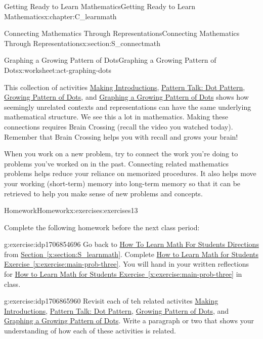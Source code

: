\documentclass[oneside,10pt,]{book}
\newcommand{\xreffont}{\relax}
\numberwithin{equation}{chapter}
\begin{document}
\begin{chapterptx}{Getting Ready to Learn Mathematics}{}{Getting Ready to Learn Mathematics}{}{}{x:chapter:C_learnmath}
\begin{sectionptx}{Connecting Mathematics Through Representations}{}{Connecting Mathematics Through Representations}{}{}{x:section:S_connectmath}
\begin{worksheet-subsection}{Graphing a Growing Pattern of Dots}{}{Graphing a Growing Pattern of Dots}{}{}{x:worksheet:act-graphing-dots}
\begin{conclusion}{}
This collection of activities \textendash{} \hyperref[x:activity:act-introductions]{Making Introductions}, \hyperref[x:subsection:SS_dot_pattern]{Pattern Talk: Dot Pattern}, \hyperref[x:worksheet:act-growing-dots]{Growing Pattern of Dots}, and \hyperref[x:worksheet:act-graphing-dots]{Graphing a Growing Pattern of Dots} \textendash{} shows how seemingly unrelated contexts and representations can have the same underlying mathematical structure. We see this a lot in mathematics. Making these connections requires Brain Crossing (recall the video you watched today). Remember that Brain Crossing helps you with recall and grows your brain!%
\par
When you work on a new problem, try to connect the work you're doing to problems you've worked on in the past. Connecting related mathematics problems helps reduce your reliance on memorized procedures. It also helps move your working (short-term) memory into long-term memory so that it can be retrieved to help you make sense of new problems and concepts.%
\end{conclusion}%
\end{worksheet-subsection}
\restoregeometry
%
%
\typeout{************************************************}
\typeout{************************************************}
%
\begin{exercises-subsection}{Homework}{}{Homework}{}{}{x:exercises:exercises13}
\begin{introduction}{}%
Complete the following homework before the next class period:%
\end{introduction}%
\begin{divisionexercise}{1}{}{}{g:exercise:idp1706854696}%
Go back to \hyperlink{x:paragraphs:htlmfs-directions}{How To Learn Math For Students Directions} from \hyperref[x:section:S_learnmath]{Section~{\xreffont\ref{x:section:S_learnmath}}}. Complete \hyperref[x:exercise:main-prob-three]{How to Learn Math for Students Exercise~{\xreffont\ref{x:exercise:main-prob-three}}}. You will hand in your written reflections for \hyperref[x:exercise:main-prob-three]{How to Learn Math for Students Exercise~{\xreffont\ref{x:exercise:main-prob-three}}} in class.%
\end{divisionexercise}%
\begin{divisionexercise}{2}{}{}{g:exercise:idp1706865960}%
Revisit each of teh related activites \hyperref[x:activity:act-introductions]{Making Introductions}, \hyperref[x:subsection:SS_dot_pattern]{Pattern Talk: Dot Pattern}, \hyperref[x:worksheet:act-growing-dots]{Growing Pattern of Dots}, and \hyperref[x:worksheet:act-graphing-dots]{Graphing a Growing Pattern of Dots}. Write a paragraph or two that shows your understanding of how each of these activities is related.%

\end{divisionexercise}
\end{exercises-subsection}
\end{sectionptx}
\end{chapterptx}
\end{document}
